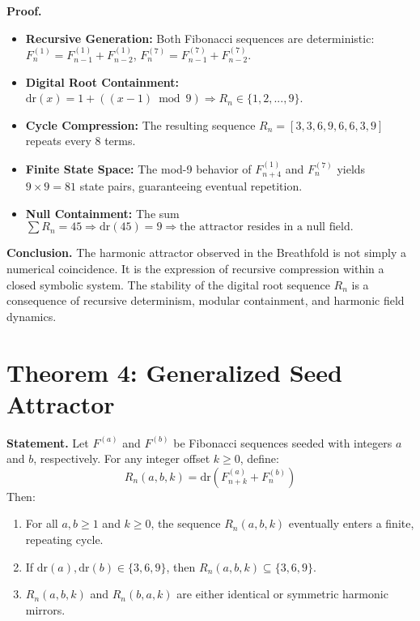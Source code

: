 \documentclass[12pt]{article}
\begin{document}
\textbf{Proof.}
\begin{itemize}
  \item \textbf{Recursive Generation:} Both Fibonacci sequences are deterministic: \( F^{(1)}_n = F^{(1)}_{n-1} + F^{(1)}_{n-2} \), \( F^{(7)}_n = F^{(7)}_{n-1} + F^{(7)}_{n-2} \).
  \item \textbf{Digital Root Containment:} \( \mathrm{dr}(x) = 1 + ((x - 1) \bmod 9) \Rightarrow R_n \in \{1,2,...,9\} \).
  \item \textbf{Cycle Compression:} The resulting sequence \( R_n = [3, 3, 6, 9, 6, 6, 3, 9] \) repeats every 8 terms.
  \item \textbf{Finite State Space:} The mod-9 behavior of \( F^{(1)}_{n+4} \) and \( F^{(7)}_n \) yields \( 9 \times 9 = 81 \) state pairs, guaranteeing eventual repetition.
  \item \textbf{Null Containment:} The sum \( \sum R_n = 45 \Rightarrow \mathrm{dr}(45) = 9 \Rightarrow \text{the attractor resides in a null field.} \)
\end{itemize}

\textbf{Conclusion.} The harmonic attractor observed in the Breathfold is not simply a numerical coincidence. It is the expression of recursive compression within a closed symbolic system. The stability of the digital root sequence \( R_n \) is a consequence of recursive determinism, modular containment, and harmonic field dynamics.

\section*{Theorem 4: Generalized Seed Attractor}
\textbf{Statement.} Let \( F^{(a)} \) and \( F^{(b)} \) be Fibonacci sequences seeded with integers \( a \) and \( b \), respectively. For any integer offset \( k \geq 0 \), define:
\[
R_n(a, b, k) = \mathrm{dr}(F^{(a)}_{n+k} + F^{(b)}_n)
\]
Then:
\begin{enumerate}
  \item For all \( a, b \geq 1 \) and \( k \geq 0 \), the sequence \( R_n(a, b, k) \) eventually enters a finite, repeating cycle.
  \item If \( \mathrm{dr}(a), \mathrm{dr}(b) \in \{3, 6, 9\} \), then \( R_n(a, b, k) \subseteq \{3, 6, 9\} \).
  \item \( R_n(a, b, k) \) and \( R_n(b, a, k) \) are either identical or symmetric harmonic mirrors.
\end{enumerate}
\end{document}
